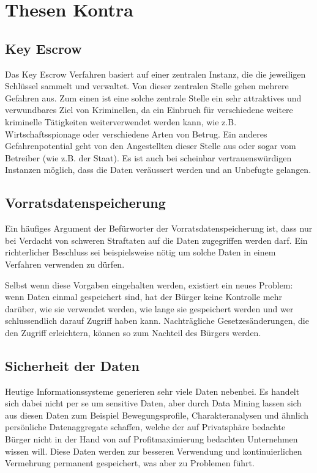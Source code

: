 %
%

\section*{Thesen Kontra}

\subsection*{Key Escrow}
Das Key Escrow Verfahren basiert auf einer zentralen Instanz,
die die jeweiligen Schlüssel sammelt und verwaltet.
Von dieser zentralen Stelle gehen mehrere Gefahren aus. Zum einen ist eine
solche zentrale Stelle ein sehr attraktives und verwundbares Ziel von Kriminellen, 
da ein Einbruch für verschiedene weitere
kriminelle Tätigkeiten weiterverwendet werden kann, wie z.B.
Wirtschaftsspionage oder verschiedene Arten von Betrug.
Ein anderes Gefahrenpotential geht von den Angestellten dieser Stelle aus oder
sogar vom Betreiber (wie z.B. der Staat).
Es ist auch bei scheinbar vertrauenswürdigen Instanzen möglich,
dass die Daten veräussert werden und an Unbefugte gelangen.

\subsection*{Vorratsdatenspeicherung}
Ein häufiges Argument der Befürworter der Vorratsdatenspeicherung ist,
dass nur bei Verdacht von schweren Straftaten auf die Daten zugegriffen werden darf.
Ein richterlicher Beschluss sei beispielsweise nötig um solche Daten
in einem Verfahren verwenden zu dürfen.

Selbst wenn diese Vorgaben eingehalten werden, existiert ein
neues Problem: wenn Daten einmal gespeichert sind, hat der 
Bürger keine Kontrolle mehr darüber, wie sie verwendet werden,
wie lange sie gespeichert werden und wer schlussendlich darauf
Zugriff haben kann. Nachträgliche Gesetzesänderungen, die den Zugriff erleichtern, können so zum Nachteil
des Bürgers werden.

\subsection*{Sicherheit der Daten}
Heutige Informationssysteme generieren sehr viele Daten nebenbei. Es
handelt sich dabei nicht per se um sensitive Daten, aber durch Data
Mining lassen sich aus diesen Daten zum Beispiel Bewegungsprofile,
Charakteranalysen und ähnlich persönliche Datenaggregate schaffen,
welche der auf Privatsphäre bedachte Bürger nicht in der Hand von auf
Profitmaximierung bedachten Unternehmen wissen will.
Diese Daten werden zur besseren Verwendung und kontinuierlichen
Vermehrung permanent gespeichert, was aber zu Problemen führt. 

